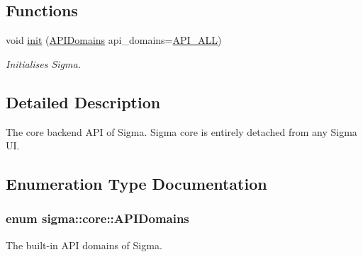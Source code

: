 \subsection*{Functions}
\begin{DoxyCompactItemize}
\item 
void \hyperlink{namespacesigma_1_1core_ae59ffd8d8b483f24878a0bf7425c436c}{init} (\hyperlink{namespacesigma_1_1core_a48ec553a4adec5e4ca04a94946e39227}{A\-P\-I\-Domains} api\-\_\-domains=\hyperlink{namespacesigma_1_1core_a48ec553a4adec5e4ca04a94946e39227a5328f8d7cbf6b6709e5f314832bcb007}{A\-P\-I\-\_\-\-A\-L\-L})
\begin{DoxyCompactList}\small\item\em Initialises Sigma. \end{DoxyCompactList}\end{DoxyCompactItemize}


\subsection{Detailed Description}
The core backend A\-P\-I of Sigma. Sigma core is entirely detached from any Sigma U\-I. 

\subsection{Enumeration Type Documentation}
\hypertarget{namespacesigma_1_1core_a48ec553a4adec5e4ca04a94946e39227}{
\subsubsection[{A\-P\-I\-Domains}]{\setlength{\rightskip}{0pt plus 5cm}enum {\bf sigma\-::core\-::\-A\-P\-I\-Domains}}}\label{namespacesigma_1_1core_a48ec553a4adec5e4ca04a94946e39227}


The built-\/in A\-P\-I domains of Sigma. 

